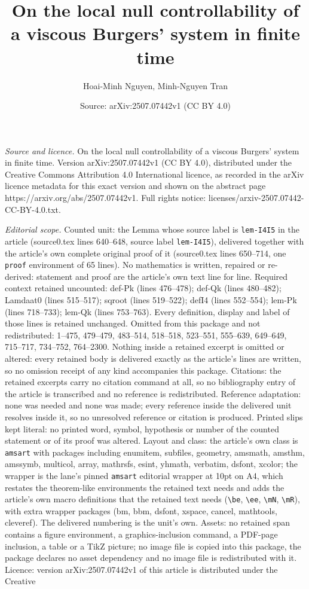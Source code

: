 \documentclass[10pt,a4paper]{amsart}
\title[On the local null controllability of a viscous Burgers' syst]{On the local null controllability of a viscous Burgers' system in finite time}
\author{Hoai-Minh Nguyen, Minh-Nguyen Tran}
\date{Source: arXiv:2507.07442v1 (CC BY 4.0)}
\begin{document}
\maketitle

\noindent\emph{Source and licence.} On the local null controllability of a viscous Burgers' system in finite time. Version arXiv:2507.07442v1 (CC BY 4.0), distributed under the Creative Commons Attribution 4.0 International licence, as recorded in the arXiv licence metadata for this exact version and shown on the abstract page https://arxiv.org/abs/2507.07442v1. Full rights notice: licenses/arxiv-2507.07442-CC-BY-4.0.txt.\par\smallskip

\noindent\textit{Editorial scope.} Counted unit: the Lemma whose source label is \texttt{lem-I4I5} in the article (source0.tex lines 640--648, source label \texttt{lem-I4I5}), delivered together with the article's own complete original proof of it (source0.tex lines 650--714, one \texttt{proof} environment of 65 lines). No mathematics is written, repaired or re-derived: statement and proof are the article's own text line for line. Required context retained uncounted: def-Pk (lines 476--478); def-Qk (lines 480--482); Lamdaat0 (lines 515--517); sqroot (lines 519--522); defI4 (lines 552--554); lem-Pk (lines 718--733); lem-Qk (lines 753--763). Every definition, display and label of those lines is retained unchanged. Omitted from this package and not redistributed: 1--475, 479--479, 483--514, 518--518, 523--551, 555--639, 649--649, 715--717, 734--752, 764--2300. Nothing inside a retained excerpt is omitted or altered: every retained body is delivered exactly as the article's lines are written, so no omission receipt of any kind accompanies this package. Citations: the retained excerpts carry no citation command at all, so no bibliography entry of the article is transcribed and no reference is redistributed. Reference adaptation: none was needed and none was made; every reference inside the delivered unit resolves inside it, so no unresolved reference or citation is produced. Printed slips kept literal: no printed word, symbol, hypothesis or number of the counted statement or of its proof was altered. Layout and class: the article's own class is \texttt{amsart} with packages including enumitem, subfiles, geometry, amsmath, amsthm, amssymb, multicol, array, mathrsfs, esint, yhmath, verbatim, dsfont, xcolor; the wrapper is the lane's pinned \texttt{amsart} editorial wrapper at 10pt on A4, which restates the theorem-like environments the retained text needs and adds the article's own macro definitions that the retained text needs (\texttt{\textbackslash be}, \texttt{\textbackslash ee}, \texttt{\textbackslash mN}, \texttt{\textbackslash mR}), with extra wrapper packages (bm, bbm, dsfont, xspace, cancel, mathtools, cleveref). The delivered numbering is the unit's own. Assets: no retained span contains a figure environment, a graphics-inclusion command, a PDF-page inclusion, a table or a TikZ picture; no image file is copied into this package, the package declares no asset dependency and no image file is redistributed with it. Licence: version arXiv:2507.07442v1 of this article is distributed under the Creative 
\end{document}
